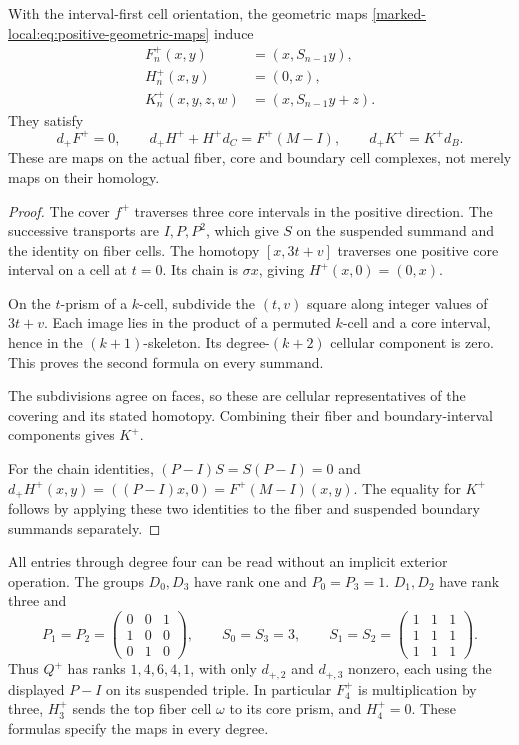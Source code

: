 \begin{theorem}\label{marked-local:thm:positive-chains}
With the interval-first cell orientation, the geometric maps
\eqref{marked-local:eq:positive-geometric-maps} induce
\begin{equation}\label{marked-local:eq:positive-FHK}
 \begin{split}
 F^+_n(x,y)&=(x,S_{n-1}y),\\
 H^+_n(x,y)&=(0,x),\\
 K^+_n(x,y,z,w)&=(x,S_{n-1}y+z).
 \end{split}
\end{equation}
They satisfy
\begin{equation}\label{marked-local:eq:positive-identities}
 d_+F^+=0,\qquad d_+H^++H^+d_C=F^+(M-I),
 \qquad d_+K^+=K^+d_B.
\end{equation}
These are maps on the actual fiber, core and boundary cell complexes,
not merely maps on their homology.
\end{theorem}

\begin{proof}
The cover $f^+$ traverses three core intervals in the positive
direction. The successive transports are $I,P,P^2$, which give
$S$ on the suspended summand and the identity on fiber cells.
The homotopy $[x,3t+v]$ traverses one positive core interval on
a cell at $t=0$. Its chain is $\sigma x$, giving $H^+(x,0)=(0,x)$.

On the $t$-prism of a $k$-cell, subdivide the $(t,v)$ square along
integer values of $3t+v$. Each image lies in the product of a
permuted $k$-cell and a core interval, hence in the $(k+1)$-skeleton.
Its degree-$(k+2)$ cellular component is zero. This proves the second
formula on every summand.

The subdivisions agree on faces, so these
are cellular representatives of the covering and its stated homotopy.
Combining their fiber and boundary-interval components gives $K^+$.

For the chain identities, $(P-I)S=S(P-I)=0$ and
$d_+H^+(x,y)=((P-I)x,0)=F^+(M-I)(x,y)$.
The equality for $K^+$ follows by applying these two identities to
the fiber and suspended boundary summands separately.
\end{proof}

All entries through degree four can be read without an implicit
exterior operation. The groups $D_0,D_3$ have rank one and
$P_0=P_3=1$. $D_1,D_2$ have rank three and
\[
 P_1=P_2=\begin{pmatrix}0&0&1\\1&0&0\\0&1&0\end{pmatrix},
 \qquad S_0=S_3=3,\qquad
 S_1=S_2=\begin{pmatrix}1&1&1\\1&1&1\\1&1&1\end{pmatrix}.
\]
Thus $Q^+$ has ranks $1,4,6,4,1$, with only $d_{+,2}$ and
$d_{+,3}$ nonzero, each using the displayed $P-I$ on its suspended
triple. In particular $F^+_4$ is multiplication by three, $H^+_3$
sends the top fiber cell $\omega$ to its core prism, and $H^+_4=0$.
These formulas specify the maps in every degree.

